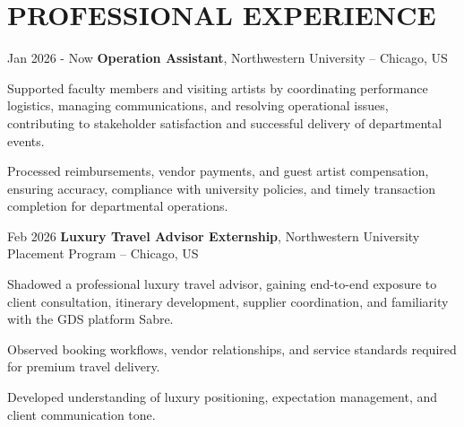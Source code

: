 \section{PROFESSIONAL EXPERIENCE}

\vspace{0.20 cm}
\begin{twocolentry}{
        Jan 2026 - Now
    }
    {\ResumeEntryTitleFont\textbf{Operation Assistant}}, {\ResumeEntryMetaFont Northwestern University -- Chicago, US}
\end{twocolentry}

\vspace{0.10 cm}
\begin{onecolentry}
    \begin{highlights}
        \item {\ResumeBulletFont Supported faculty members and visiting artists by coordinating performance logistics, managing communications, and resolving operational issues, contributing to stakeholder satisfaction and successful delivery of departmental events.}
        \item {\ResumeBulletFont Processed reimbursements, vendor payments, and guest artist compensation, ensuring accuracy, compliance with university policies, and timely transaction completion for departmental operations.}
    \end{highlights}
\end{onecolentry}

\vspace{0.20 cm}
\begin{twocolentry}{
        Feb 2026
    }
    {\ResumeEntryTitleFont\textbf{Luxury Travel Advisor Externship}}, {\ResumeEntryMetaFont Northwestern University Placement Program -- Chicago, US}
\end{twocolentry}

\vspace{0.10 cm}
\begin{onecolentry}
    \begin{highlights}
        \item {\ResumeBulletFont Shadowed a professional luxury travel advisor, gaining end-to-end exposure to client consultation, itinerary development, supplier coordination, and familiarity with the GDS platform Sabre.}
        \item {\ResumeBulletFont Observed booking workflows, vendor relationships, and service standards required for premium travel delivery.}
        \item {\ResumeBulletFont Developed understanding of luxury positioning, expectation management, and client communication tone.}
    \end{highlights}
\end{onecolentry}

